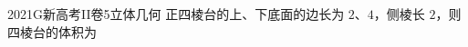 
\begin{problem}{2021}{G}{新高考II卷}{5}{立体几何}
正四棱台的上、下底面的边长为 $ 2 $、$ 4 $，侧棱长 $ 2 $，则四棱台的体积为
\begin{choices}
\end{choices}
\end{problem}

\begin{answer}

\end{answer}

\begin{solutions}

\end{solutions}